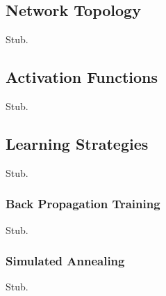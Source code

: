 \documentclass[11pt]{afthesis}
\begin{document}
	
	
	
	
	
	\subsection{Network Topology}
	
	Stub.
	
	\subsection{Activation Functions}
	
	Stub.
	
	\subsection{Learning Strategies}
	
	Stub.
	
	
	
	
	\subsubsection{Back Propagation Training} \label{sec:backpropTraining}
	Stub.
	
	
	
	
	
	
	
	\subsubsection{Simulated Annealing} 
	Stub.
	
	
	
\end{document}
